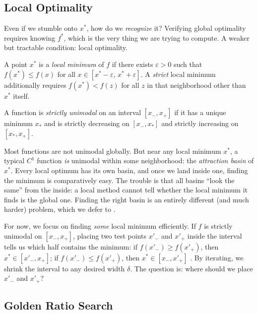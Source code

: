 \subsection{Local Optimality}\label{sec:local-opt}

Even if we stumble onto $x^*$, how do we \emph{recognize} it?
Verifying global optimality requires knowing $f^*$, which is the very thing we are trying to compute.
A weaker but tractable condition: local optimality.

\begin{definition}\label{def:local-min}
	A point $x^*$ is a \textit{local minimum} of $f$ if there exists $\varepsilon > 0$ such that $f(x^*) \leq f(x)$ for all $x \in [x^* - \varepsilon,\, x^* + \varepsilon]$.
	A \textit{strict} local minimum additionally requires $f(x^*) < f(z)$ for all $z$ in that neighborhood other than $x^*$ itself.
\end{definition}

\begin{definition}\label{def:unimodal}
	A function is \textit{strictly unimodal} on an interval $[x_-, x_+]$ if it has a unique minimum $x_*$ and is strictly decreasing on $[x_-, x_*]$ and strictly increasing on $[x_*, x_+]$.
\end{definition}

Most functions are not unimodal globally.
But near any local minimum $x^*$, a typical $C^1$ function \emph{is} unimodal within some neighborhood: the \emph{attraction basin} of $x^*$.
Every local optimum has its own basin, and once we land inside one, finding the minimum is comparatively easy.
The trouble is that all basins ``look the same'' from the inside: a local method cannot tell whether the local minimum it finds is the global one.
Finding the right basin is an entirely different (and much harder) problem, which we defer to .

For now, we focus on finding \emph{some} local minimum efficiently.
If $f$ is strictly unimodal on $[x_-, x_+]$, placing two test points $x'_-$ and $x'_+$ inside the interval tells us which half contains the minimum:
if $f(x'_-) \geq f(x'_+)$, then $x^* \in [x'_-, x_+]$;
if $f(x'_-) \leq f(x'_+)$, then $x^* \in [x_-, x'_+]$ \cite{bazaraa2006}.
By iterating, we shrink the interval to any desired width $\delta$.
The question is: where should we place $x'_-$ and $x'_+$?


\subsection{Golden Ratio Search}\label{sec:golden-ratio}

